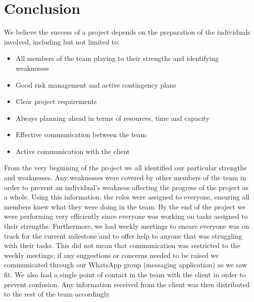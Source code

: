 \section{Conclusion}

We believe the success of a project depends on the preparation of the individuals involved, including but not limited to:
\begin{itemize}
  	\item All members of the team playing to their strengths and identifying weaknesses
	\item Good risk management and active contingency plans
	\item Clear project requirements
	\item Always planning ahead in terms of resources, time and capacity
	\item Effective communication between the team
	\item Active communication with the client
\end{itemize}

From the very beginning of the project we all identified our particular strengths and weaknesses. Any weaknesses were covered by other members of the team in order to prevent an individual's weakness affecting the progress of the project as a whole. Using this information, the roles were assigned to everyone, ensuring all members knew what they were doing in the team. By the end of the project we were performing very efficiently since everyone was working on tasks assigned to their strengths. Furthermore, we had weekly meetings to ensure everyone was on track for the current milestone and to offer help to anyone that was struggling with their tasks. This did not mean that communication was restricted to the weekly meetings; if any suggestions or concerns needed to be raised we communicated through our WhatsApp group (messaging application) as we saw fit. We also had a single point of contact in the team with the client in order to prevent confusion. Any information received from the client was then distributed to the rest of the team accordingly. 

